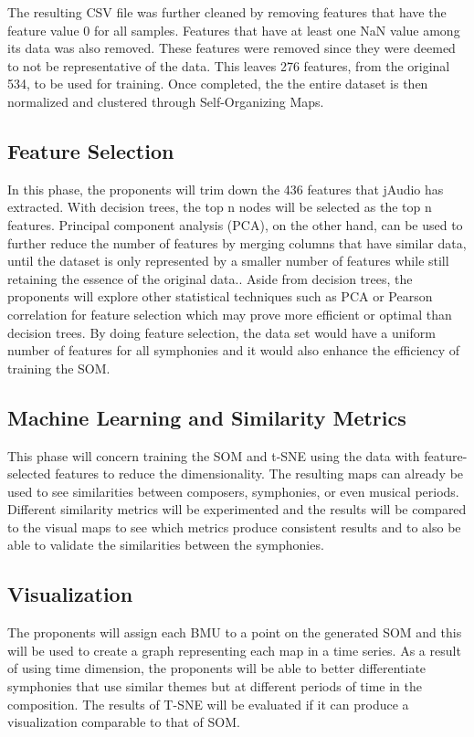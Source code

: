 The resulting CSV file was further cleaned by removing features that have the feature value 0 for all samples. Features that have at least one NaN value among its data was also removed. These features were removed since they were deemed to not be representative of the data. This leaves 276 features, from the original 534, to be used for training. Once completed, the the entire dataset is then normalized and clustered through Self-Organizing Maps.

\subsection{Feature Selection}
In this phase, the proponents will trim down the 436 features that jAudio has extracted. With decision trees, the top n nodes will be selected as the top n features. Principal component analysis (PCA), on the other hand, can be used to further reduce the number of features by merging columns that have similar data, until the dataset is only represented by a smaller number of features while still retaining the essence of the original data.. Aside from decision trees, the proponents will explore other statistical techniques such as PCA or Pearson correlation for feature selection which may prove more efficient or optimal than decision trees. By doing feature selection, the data set would have a uniform number of features for all symphonies and it would also enhance the efficiency of training the SOM.

\subsection{Machine Learning and Similarity Metrics}
This phase will concern training the SOM and t-SNE using the data with feature-selected features to reduce the dimensionality. The resulting maps can already be used to see similarities between composers, symphonies, or even musical periods. Different similarity metrics will be experimented and the results will be compared to the visual maps to see which metrics produce consistent results and to also be able to validate the similarities between the symphonies.

\subsection{Visualization}
The proponents will assign each BMU to a point on the generated SOM and this will be used to create a graph representing each map in a time series. As a result of using time dimension,  the proponents will be able to better differentiate symphonies that use similar themes but at different periods of time in the composition. The results of T-SNE will be evaluated if it can produce a visualization comparable to that of SOM.

